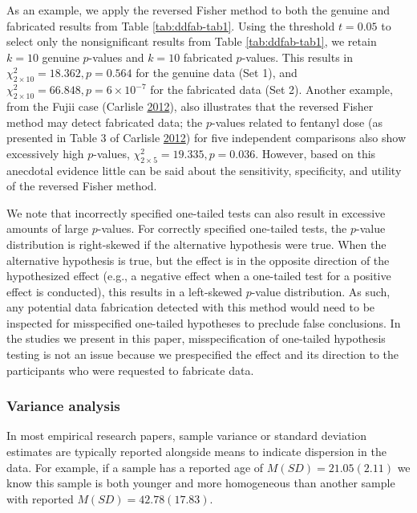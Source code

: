 \documentclass[a5paper]{book}
\begin{document}
As an example, we apply the reversed Fisher method to both the genuine
and fabricated results from Table \ref{tab:ddfab-tab1}. Using the
threshold \(t=0.05\) to select only the nonsignificant results from
Table \ref{tab:ddfab-tab1}, we retain \(k=10\) genuine \(p\)-values and
\(k=10\) fabricated \(p\)-values. This results in
\(\chi^2_{2\times10}=18.362,p=0.564\) for the genuine data (Set 1), and
\(\chi^2_{2\times10}=66.848,p=\ensuremath{6\times 10^{-7}}\) for the
fabricated data (Set 2). Another example, from the Fujii case (Carlisle
\protect\hyperlink{ref-doi:10.1111ux2fj.1365-2044.2012.07128.x}{2012}),
also illustrates that the reversed Fisher method may detect fabricated
data; the \(p\)-values related to fentanyl dose (as presented in Table 3
of Carlisle
\protect\hyperlink{ref-doi:10.1111ux2fj.1365-2044.2012.07128.x}{2012})
for five independent comparisons also show excessively high
\(p\)-values, \(\chi^2_{2\times5}=19.335, p=0.036\). However, based on
this anecdotal evidence little can be said about the sensitivity,
specificity, and utility of the reversed Fisher method.

We note that incorrectly specified one-tailed tests can also result in
excessive amounts of large \(p\)-values. For correctly specified
one-tailed tests, the \(p\)-value distribution is right-skewed if the
alternative hypothesis were true. When the alternative hypothesis is
true, but the effect is in the opposite direction of the hypothesized
effect (e.g., a negative effect when a one-tailed test for a positive
effect is conducted), this results in a left-skewed \(p\)-value
distribution. As such, any potential data fabrication detected with this
method would need to be inspected for misspecified one-tailed hypotheses
to preclude false conclusions. In the studies we present in this paper,
misspecification of one-tailed hypothesis testing is not an issue
because we prespecified the effect and its direction to the participants
who were requested to fabricate data.

\subsubsection{Variance analysis}\label{variance-analysis}

In most empirical research papers, sample variance or standard deviation
estimates are typically reported alongside means to indicate dispersion
in the data. For example, if a sample has a reported age of
\(M(SD)=21.05(2.11)\) we know this sample is both younger and more
homogeneous than another sample with reported \(M(SD)=42.78(17.83)\).
\end{document}
